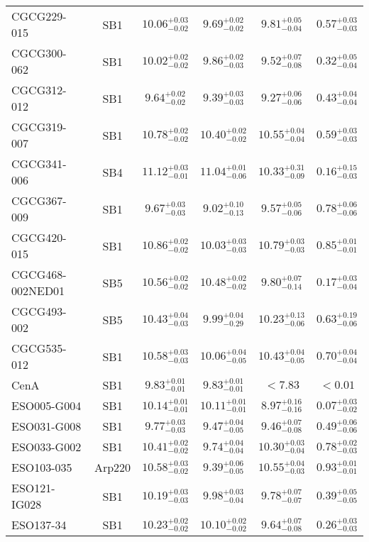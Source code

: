 \documentclass[onecolumn]{mn2e}
\begin{document}
{\begin{center}
\begin{longtable}{lccccc}
CGCG229-015 & SB1 & $10.06_{-0.02}^{+0.03}$ & $9.69_{-0.02}^{+0.02}$ & $9.81_{-0.04}^{+0.05}$ &$0.57_{-0.03}^{+0.03}$ \\
CGCG300-062 & SB1 & $10.02_{-0.02}^{+0.02}$ & $9.86_{-0.03}^{+0.02}$ & $9.52_{-0.08}^{+0.07}$ &$0.32_{-0.04}^{+0.05}$ \\
CGCG312-012 & SB1 & $9.64_{-0.02}^{+0.02}$ & $9.39_{-0.03}^{+0.03}$ & $9.27_{-0.06}^{+0.06}$ &$0.43_{-0.04}^{+0.04}$ \\
CGCG319-007 & SB1 & $10.78_{-0.02}^{+0.02}$ & $10.40_{-0.02}^{+0.02}$ & $10.55_{-0.04}^{+0.04}$ &$0.59_{-0.03}^{+0.03}$ \\
CGCG341-006 & SB4 & $11.12_{-0.01}^{+0.03}$ & $11.04_{-0.06}^{+0.01}$ & $10.33_{-0.09}^{+0.31}$ &$0.16_{-0.03}^{+0.15}$ \\
CGCG367-009 & SB1 & $9.67_{-0.03}^{+0.03}$ & $9.02_{-0.13}^{+0.10}$ & $9.57_{-0.06}^{+0.05}$ &$0.78_{-0.06}^{+0.06}$ \\
CGCG420-015 & SB1 & $10.86_{-0.02}^{+0.02}$ & $10.03_{-0.03}^{+0.03}$ & $10.79_{-0.03}^{+0.03}$ &$0.85_{-0.01}^{+0.01}$ \\
CGCG468-002NED01 & SB5 & $10.56_{-0.02}^{+0.02}$ & $10.48_{-0.02}^{+0.02}$ & $9.80_{-0.14}^{+0.07}$ &$0.17_{-0.04}^{+0.03}$ \\
CGCG493-002 & SB5 & $10.43_{-0.03}^{+0.04}$ & $9.99_{-0.29}^{+0.04}$ & $10.23_{-0.06}^{+0.13}$ &$0.63_{-0.06}^{+0.19}$ \\
CGCG535-012 & SB1 & $10.58_{-0.03}^{+0.03}$ & $10.06_{-0.05}^{+0.04}$ & $10.43_{-0.05}^{+0.04}$ &$0.70_{-0.04}^{+0.04}$ \\
CenA & SB1 & $9.83_{-0.01}^{+0.01}$ & $9.83_{-0.01}^{+0.01}$ & $<7.83$ &$<0.01$ \\
ESO005-G004 & SB1 & $10.14_{-0.01}^{+0.01}$ & $10.11_{-0.01}^{+0.01}$ & $8.97_{-0.16}^{+0.16}$ &$0.07_{-0.02}^{+0.03}$ \\
ESO031-G008 & SB1 & $9.77_{-0.03}^{+0.03}$ & $9.47_{-0.05}^{+0.04}$ & $9.46_{-0.08}^{+0.07}$ &$0.49_{-0.06}^{+0.06}$ \\
ESO033-G002 & SB1 & $10.41_{-0.02}^{+0.02}$ & $9.74_{-0.04}^{+0.04}$ & $10.30_{-0.04}^{+0.03}$ &$0.78_{-0.03}^{+0.02}$ \\
ESO103-035 & Arp220 & $10.58_{-0.02}^{+0.03}$ & $9.39_{-0.05}^{+0.06}$ & $10.55_{-0.03}^{+0.04}$ &$0.93_{-0.01}^{+0.01}$ \\
ESO121-IG028 & SB1 & $10.19_{-0.03}^{+0.03}$ & $9.98_{-0.04}^{+0.03}$ & $9.78_{-0.07}^{+0.07}$ &$0.39_{-0.05}^{+0.05}$ \\
ESO137-34 & SB1 & $10.23_{-0.02}^{+0.02}$ & $10.10_{-0.02}^{+0.02}$ & $9.64_{-0.08}^{+0.07}$ &$0.26_{-0.03}^{+0.03}$ \\

\end{longtable}
\end{center}}
\end{document}
